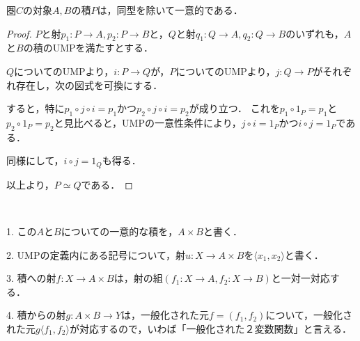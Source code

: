\documentclass[uplatex, 12pt, dvipdfmx]{jsarticle}
\begin{document}
\begin{proposition}
    圏$C$の対象$A,B$の積$P$は，同型を除いて一意的である．
\end{proposition}
\begin{proof}
    $P$と射$p_1:P\to A, p_2:P\to B$と，$Q$と射$q_1:Q\to A,q_2:Q\to B$のいずれも，$A$と$B$の積のUMPを満たすとする．

    $Q$についてのUMPより，$i:P\to Q$が，$P$についてのUMPより，$j:Q\to P$がそれぞれ存在し，次の図式を可換にする．
    \begin{center}
    \end{center}
    すると，特に$p_1\circ j\circ i=p_1$かつ$p_2\circ j\circ i=p_2$が成り立つ．
    これを$p_1\circ 1_P=p_1$と$p_2\circ 1_P=p_2$と見比べると，UMPの一意性条件により，$j\circ i=1_P$かつ$i\circ j=1_P$である．

    同様にして，$i\circ j=1_Q$も得る．

    以上より，$P\simeq Q$である．
\end{proof}
\vspace{3cm}

\begin{notation*}　

    1. この$A$と$B$についての一意的な積を，$A\times B$と書く．
\vspace{1cm}

    2. UMPの定義内にある記号について，射$u:X\to A\times B$を$\langle x_1,x_2\rangle$と書く．
    \vspace{1cm}

    3. 積への射$f:X\to A\times B$は，射の組$(f_1:X\to A,f_2:X\to B)$と一対一対応する．
\vspace{1cm}

    4. 積からの射$g:A\times B\to Y$は，一般化された元$f=(f_1,f_2)$について，一般化された元$g\langle f_1,f_2\rangle$が対応するので，いわば「一般化された２変数関数」と言える．
    \begin{center}
    \end{center}
\end{notation*}
\end{document}
